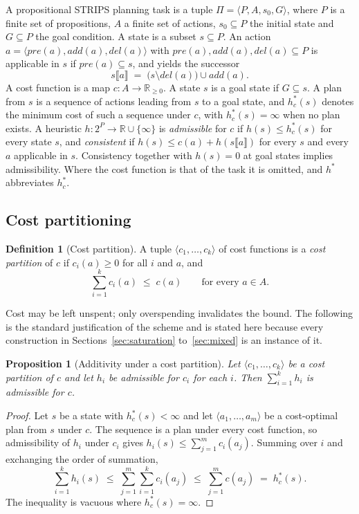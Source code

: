 \documentclass[10pt,twocolumn,a4paper]{article}
\theoremstyle{plain}
\newtheorem{proposition}[theorem]{Proposition}
\theoremstyle{definition}
\newtheorem{definition}[theorem]{Definition}
\theoremstyle{remark}
\newcommand{\Task}{\Pi}
\newcommand{\hstar}{h^{*}}
\newcommand{\pre}{\mathit{pre}}
\newcommand{\add}{\mathit{add}}
\newcommand{\del}{\mathit{del}}
\newcommand{\R}{\mathbb{R}}
\begin{document}
A propositional STRIPS planning task is a tuple
$\Task = \langle P, A, s_0, G \rangle$, where $P$ is a finite set of
propositions, $A$ a finite set of actions, $s_0 \subseteq P$ the initial state
and $G \subseteq P$ the goal condition. A state is a subset $s \subseteq P$. An
action $a = \langle \pre(a), \add(a), \del(a) \rangle$ with
$\pre(a), \add(a), \del(a) \subseteq P$ is applicable in $s$ if
$\pre(a) \subseteq s$, and yields the successor
\[
  s\llbracket a \rrbracket \;=\; \bigl( s \setminus \del(a) \bigr) \cup \add(a).
\]
A cost function is a map $c : A \to \R_{\ge 0}$. A state $s$ is a goal state if
$G \subseteq s$. A plan from $s$ is a sequence of actions leading from $s$ to a
goal state, and $\hstar_c(s)$ denotes the minimum cost of such a sequence under
$c$, with $\hstar_c(s) = \infty$ when no plan exists. A heuristic
$h : 2^{P} \to \R \cup \{\infty\}$ is \emph{admissible} for $c$ if
$h(s) \le \hstar_c(s)$ for every state $s$, and \emph{consistent} if
$h(s) \le c(a) + h(s\llbracket a \rrbracket)$ for every $s$ and every $a$
applicable in $s$. Consistency together with $h(s) = 0$ at goal states implies
admissibility. Where the cost function is that of the task it is omitted, and
$\hstar$ abbreviates $\hstar_c$.

\subsection{Cost partitioning}

\begin{definition}[Cost partition]
\label{def:partition}
A tuple $\langle c_1, \dots, c_k \rangle$ of cost functions is a
\emph{cost partition} of $c$ if $c_i(a) \ge 0$ for all $i$ and $a$, and
\[
  \sum_{i=1}^{k} c_i(a) \;\le\; c(a) \qquad \text{for every } a \in A .
\]
\end{definition}

Cost may be left unspent; only overspending invalidates the bound. The
following is the standard justification of the scheme and is stated here
because every construction in Sections~\ref{sec:saturation}
to~\ref{sec:mixed} is an instance of it.

\begin{proposition}[Additivity under a cost partition]
\label{prop:additivity}
Let $\langle c_1, \dots, c_k \rangle$ be a cost partition of $c$ and let $h_i$
be admissible for $c_i$ for each $i$. Then $\sum_{i=1}^{k} h_i$ is admissible
for $c$.
\end{proposition}

\begin{proof}
Let $s$ be a state with $\hstar_c(s) < \infty$ and let
$\langle a_1, \dots, a_m \rangle$ be a cost-optimal plan from $s$ under $c$.
The sequence is a plan under every cost function, so admissibility of $h_i$
under $c_i$ gives $h_i(s) \le \sum_{j=1}^{m} c_i(a_j)$. Summing over $i$ and
exchanging the order of summation,
\[
  \sum_{i=1}^{k} h_i(s) \;\le\; \sum_{j=1}^{m} \sum_{i=1}^{k} c_i(a_j)
  \;\le\; \sum_{j=1}^{m} c(a_j) \;=\; \hstar_c(s).
\]
The inequality is vacuous where $\hstar_c(s) = \infty$.
\end{proof}
\end{document}
